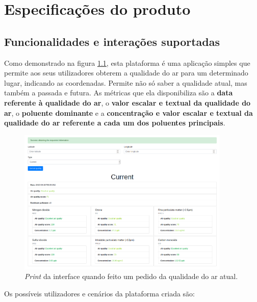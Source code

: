 
\chapter{Especificações do produto}

\section{Funcionalidades e interações suportadas}
Como demonstrado na figura \ref{fig:interface_current}, esta plataforma é uma aplicação simples que permite aos seus 
utilizadores obterem a qualidade do ar para um determinado lugar, indicando as coordenadas. Permite não só
saber a qualidade atual, mas também a passada e futura. As métricas que ela disponibiliza são a \textbf{data 
referente à qualidade do ar}, o \textbf{valor escalar e textual da qualidade do ar}, o \textbf{poluente 
dominante} e a \textbf{concentração e valor escalar e textual da qualidade do ar referente a cada um dos
poluentes principais}.

\begin{figure}[h]
   \centering
   \includegraphics[width=0.90\textwidth]{images/interface_current}
   \caption{\textit{Print} da interface quando feito um pedido da qualidade do ar atual.}
   \label{fig:interface_current}
\end{figure}

Os possíveis utilizadores e cenários da plataforma criada são:

